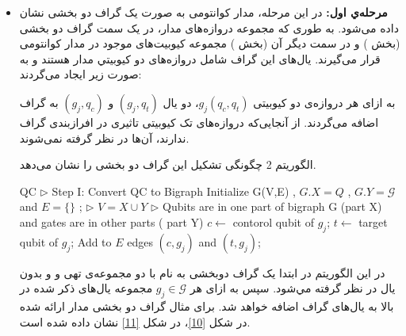\begin{itemize}
\item
\textbf{مرحله‌ي اول:}
در این مرحله، مدار کوانتومی به صورت یک گراف دو بخشی نشان داده می‌شود. به طوری که مجموعه دروازه‌های مدار، در یک سمت گراف دو بخشی (بخش ) و در سمت دیگر آن (بخش ) مجموعه کیوبیت‌های موجود در مدار کوانتومی قرار می‌گیرند. یال‌های اين گراف شامل دروازه‌های دو کیوبیتي مدار هستند و به صورت زیر ایجاد می‌گردند:

به ازای هر دروازه‌ی دو کیوبیتی $g_{j}(q_{c},q_{t})$، دو یال $(g_{j},q_{t})$ و $(g_{j},q_{c})$ به گراف اضافه می‌گردند. از آنجایی‌که دروازه‌های تک کیوبیتی تاثیری در افرازبندی گراف ندارند، آن‌ها در نظر گرفته نمی‌شوند. 

الگوریتم 2 چگونگی تشکیل این گراف دو بخشی را نشان می‌دهد.
\begin{latin}
 \begin{algorithm}
{
\fontsize{9}{1}
\caption{This algorithm converts quantum circuit to bigraph}
\begin{algorithmic}[2]
 {QC}
\State\textcolor[rgb]{0.00,0.50,1.00}{ $\triangleright$   Step I: Convert QC to Bigraph}
\State Initialize G(V,E) ,   $G.X=Q$  ,  $G.Y=\mathcal{G}$ and   $ E=\{\}$ ; \textcolor[rgb]{0.00,0.50,1.00}{ $\triangleright$ $ V=X \cup Y$}
\State\textcolor[rgb]{0.00,0.50,1.00}{ $\triangleright$  Qubits are in one part of bigraph G (part X) and gates are in other parts ( part Y)  }
         \State $c\leftarrow$ contorol qubit of $g_{j}$;
        \State $t \leftarrow$ target qubit of $g_{j}$;
         \State  Add to $E$ edges $(c,g_{j})$ and $(t,g_{j})$;
 \EndFor
\EndFunction
\end{algorithmic}
}
\end{algorithm}
\end{latin}
در این الگوریتم در ابتدا یک گراف دوبخشی به نام  با دو مجموعه‌ی تهی  و  و بدون یال در نظر گرفته مي‌شود. سپس به ازای هر $g_j \in \mathcal{G}$ مجموعه یال‌های ذکر شده در بالا به یال‌های گراف اضافه خواهد شد. برای مثال گراف دو بخشی  مدار ارائه شده در شکل \ref{10}، در شکل \ref{11} نشان داده شده است.
\begin{figure}
\begin{center}

\end{center}
\end{figure}
\end{itemize}
